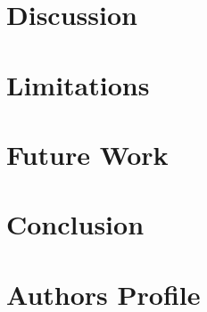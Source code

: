 \documentclass[11pt,a4paper]{article}
\begin{document}
\section{Discussion}

\section{Limitations}

\section{Future Work}

\section{Conclusion}




\section*{Authors Profile}
\end{document}
